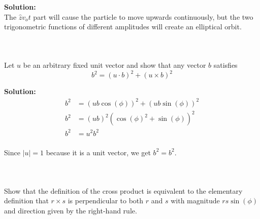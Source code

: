 \documentclass{article}
\newcommand\Problem{%
    \subsubsection{}~%
}
\newcommand\TheSolution{%
  \textbf{Solution:}\\%
}
\begin{document}
\TheSolution
The $\hat{z}v_o t$ part will cause the particle to move upwards continuously, but the two trigonometric functions of different amplitudes will create an elliptical orbit.

\Problem
Let $u$ be an arbitrary fixed unit vector and show that any vector $b$ satisfies
\[b^2 = (u \cdot b)^2 + (u \times b)^2\]

\TheSolution
\begin{equation}
    \begin{aligned}
        b^2 & = (ub\cos(\phi))^2 + (ub\sin(\phi))^2 \\
        b^2 & = (ub)^2(\cos(\phi)^2 + \sin(\phi))^2 \\
        b^2 & = u^2 b^2                             \\
    \end{aligned}
\end{equation}

Since $|u| = 1$ because it is a unit vector, we get $b^2 = b^2$.

\Problem
Show that the definition of the cross product is equivalent to the elementary definition that $r \times s$ is perpendicular to both $r$ and $s$ with magnitude $rs\sin(\phi)$ and direction given by the right-hand rule.
\end{document}
